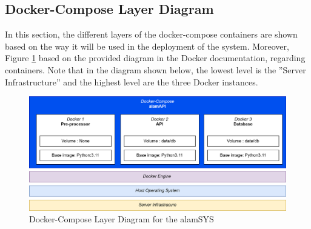 \subsection{Docker-Compose Layer Diagram}
\label{subsec:docker_compose_diagram}
In this section, the different layers of the docker-compose 
containers are shown based on the way it will be used in the 
deployment of the system. Moreover, Figure \ref{fig:docker_compose_layout} 
based on the provided diagram in the Docker documentation, regarding containers. 
Note that in the diagram shown below, the lowest level is the 
”Server Infrastructure” and the highest level are the three Docker instances.
\begin{figure}[ht]
    \centering
    \includegraphics[width=1\textwidth]{./assets/Docker-Compose Layout.png}
    \caption{Docker-Compose Layer Diagram for the alamSYS}
    \label{fig:docker_compose_layout}
\end{figure}
